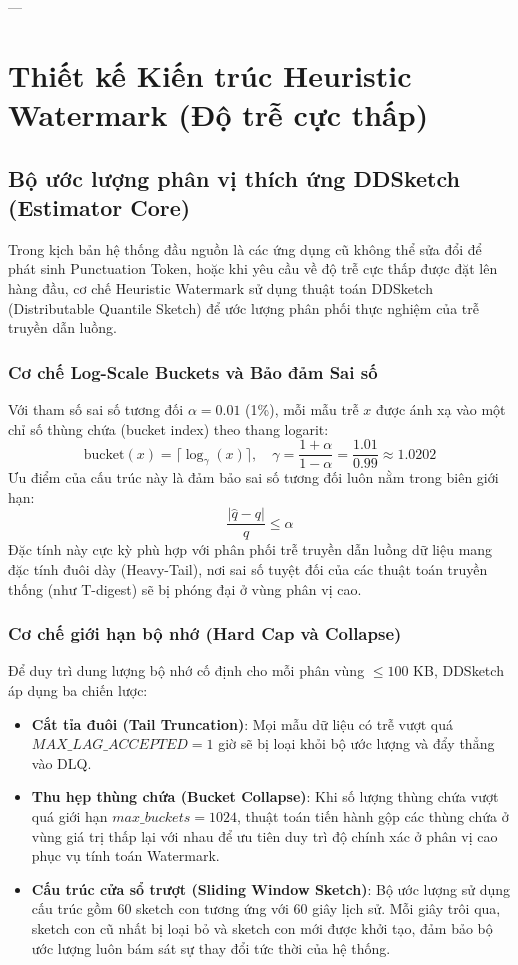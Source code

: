 \documentclass[12pt,a4paper]{article}
\begin{document}
---

\section{Thiết kế Kiến trúc Heuristic Watermark (Độ trễ cực thấp)}

\subsection{Bộ ước lượng phân vị thích ứng DDSketch (Estimator Core)}
Trong kịch bản hệ thống đầu nguồn là các ứng dụng cũ không thể sửa đổi để phát sinh Punctuation Token, hoặc khi yêu cầu về độ trễ cực thấp được đặt lên hàng đầu, cơ chế Heuristic Watermark sử dụng thuật toán DDSketch (Distributable Quantile Sketch) để ước lượng phân phối thực nghiệm của trễ truyền dẫn luồng.

\subsubsection{Cơ chế Log-Scale Buckets và Bảo đảm Sai số}
Với tham số sai số tương đối $\alpha = 0.01$ (1\%), mỗi mẫu trễ $x$ được ánh xạ vào một chỉ số thùng chứa (bucket index) theo thang logarit:
\begin{equation}
\text{bucket}(x) = \lceil \log_\gamma(x) \rceil, \quad \gamma = \frac{1+\alpha}{1-\alpha} = \frac{1.01}{0.99} \approx 1.0202
\end{equation}
Ưu điểm của cấu trúc này là đảm bảo sai số tương đối luôn nằm trong biên giới hạn:
\begin{equation}
\frac{|\hat{q} - q|}{q} \le \alpha
\end{equation}
Đặc tính này cực kỳ phù hợp với phân phối trễ truyền dẫn luồng dữ liệu mang đặc tính đuôi dày (Heavy-Tail), nơi sai số tuyệt đối của các thuật toán truyền thống (như T-digest) sẽ bị phóng đại ở vùng phân vị cao.

\subsubsection{Cơ chế giới hạn bộ nhớ (Hard Cap và Collapse)}
Để duy trì dung lượng bộ nhớ cố định cho mỗi phân vùng $\le 100$ KB, DDSketch áp dụng ba chiến lược:
\begin{itemize}
    \item \textbf{Cắt tỉa đuôi (Tail Truncation)}: Mọi mẫu dữ liệu có trễ vượt quá $MAX\_LAG\_ACCEPTED = 1$ giờ sẽ bị loại khỏi bộ ước lượng và đẩy thẳng vào DLQ.
    \item \textbf{Thu hẹp thùng chứa (Bucket Collapse)}: Khi số lượng thùng chứa vượt quá giới hạn $max\_buckets = 1024$, thuật toán tiến hành gộp các thùng chứa ở vùng giá trị thấp lại với nhau để ưu tiên duy trì độ chính xác ở phân vị cao phục vụ tính toán Watermark.
    \item \textbf{Cấu trúc cửa sổ trượt (Sliding Window Sketch)}: Bộ ước lượng sử dụng cấu trúc gồm 60 sketch con tương ứng với 60 giây lịch sử. Mỗi giây trôi qua, sketch con cũ nhất bị loại bỏ và sketch con mới được khởi tạo, đảm bảo bộ ước lượng luôn bám sát sự thay đổi tức thời của hệ thống.
\end{itemize}
\end{document}
